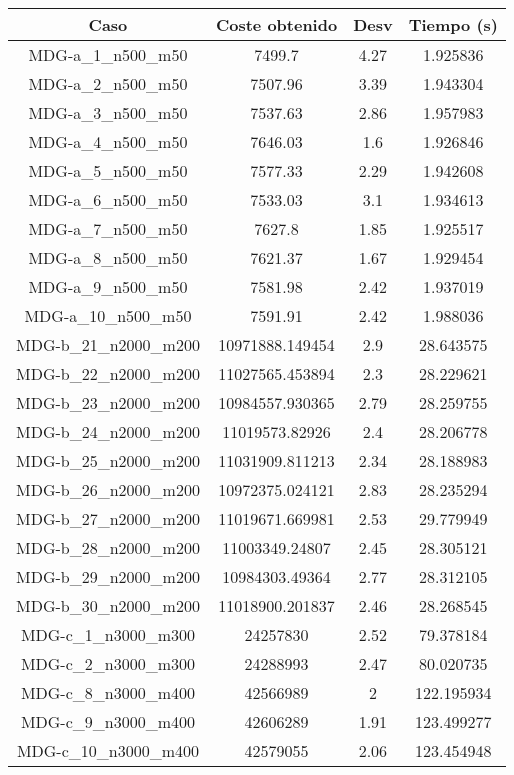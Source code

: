 \documentclass{article}
\begin{document}
\begin{table}[H]
	\centering
	\begin{tabular}{|cccc|}
		\hline
		Caso & Coste obtenido & Desv & Tiempo (s)\\ \hline
		MDG-a\_1\_n500\_m50 & 7499.7 & 4.27 & 1.925836\\
		MDG-a\_2\_n500\_m50 & 7507.96 & 3.39 & 1.943304\\
		MDG-a\_3\_n500\_m50 & 7537.63 & 2.86 & 1.957983\\
		MDG-a\_4\_n500\_m50 & 7646.03 & 1.6 & 1.926846\\
		MDG-a\_5\_n500\_m50 & 7577.33 & 2.29 & 1.942608\\
		MDG-a\_6\_n500\_m50 & 7533.03 & 3.1 & 1.934613\\
		MDG-a\_7\_n500\_m50 & 7627.8 & 1.85 & 1.925517\\
		MDG-a\_8\_n500\_m50 & 7621.37 & 1.67 & 1.929454\\
		MDG-a\_9\_n500\_m50 & 7581.98 & 2.42 & 1.937019\\
		MDG-a\_10\_n500\_m50 & 7591.91 & 2.42 & 1.988036\\
		MDG-b\_21\_n2000\_m200 & 10971888.149454 & 2.9 & 28.643575\\
		MDG-b\_22\_n2000\_m200 & 11027565.453894 & 2.3 & 28.229621\\
		MDG-b\_23\_n2000\_m200 & 10984557.930365 & 2.79 & 28.259755\\
		MDG-b\_24\_n2000\_m200 & 11019573.82926 & 2.4 & 28.206778\\
		MDG-b\_25\_n2000\_m200 & 11031909.811213 & 2.34 & 28.188983\\
		MDG-b\_26\_n2000\_m200 & 10972375.024121 & 2.83 & 28.235294\\
		MDG-b\_27\_n2000\_m200 & 11019671.669981 & 2.53 & 29.779949\\
		MDG-b\_28\_n2000\_m200 & 11003349.24807 & 2.45 & 28.305121\\
		MDG-b\_29\_n2000\_m200 & 10984303.49364 & 2.77 & 28.312105\\
		MDG-b\_30\_n2000\_m200 & 11018900.201837 & 2.46 & 28.268545\\
		MDG-c\_1\_n3000\_m300 & 24257830 & 2.52 & 79.378184\\
		MDG-c\_2\_n3000\_m300 & 24288993 & 2.47 & 80.020735\\
		MDG-c\_8\_n3000\_m400 & 42566989 & 2 & 122.195934\\
		MDG-c\_9\_n3000\_m400 & 42606289 & 1.91 & 123.499277\\
		MDG-c\_10\_n3000\_m400 & 42579055 & 2.06 & 123.454948\\

\end{tabular}
\end{table}
\end{document}
